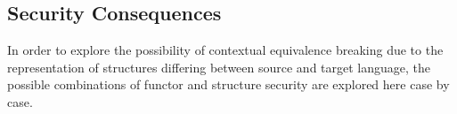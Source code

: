 \documentclass[10pt,a4paper,master=cws, masteroption=ai,english,inputenc=utf8]{kulemt}
\begin{document}


\subsection{Security Consequences}

In order to explore the possibility of contextual equivalence breaking due to the representation of structures differing between source and target language, the possible combinations of functor and structure security are explored here case by case.
\end{document}
